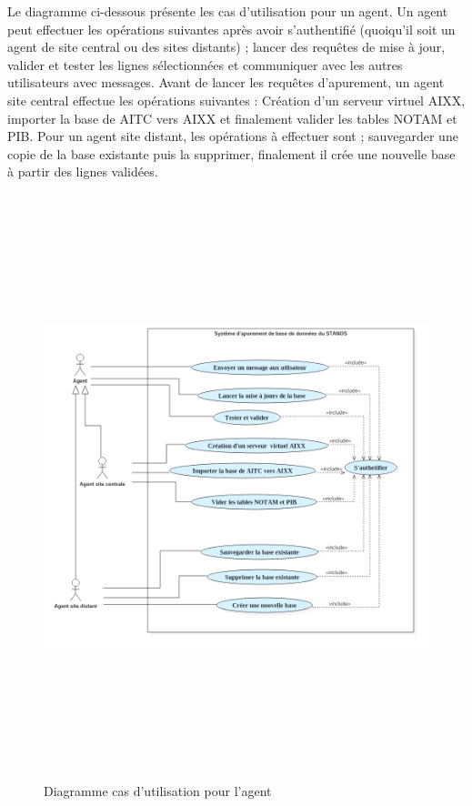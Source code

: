 Le diagramme ci-dessous présente les cas d’utilisation pour un agent. Un agent peut effectuer les opérations suivantes après avoir s’authentifié (quoiqu’il soit un agent de site central ou des sites distants) ; lancer des requêtes de mise à jour, valider et tester les lignes sélectionnées et communiquer avec les autres utilisateurs avec messages. Avant de lancer les requêtes d’apurement, un agent site central effectue les opérations suivantes : Création d’un serveur virtuel AIXX, importer la base de AITC vers AIXX et finalement valider les tables NOTAM et PIB. Pour un agent site distant, les opérations à effectuer sont ; sauvegarder une copie de la base existante puis la supprimer, finalement il crée une nouvelle base à partir des lignes validées.

\begin{figure}[!h]
\begin{center}
\includegraphics[width=17cm,height=17cm]{besoins/UseCaseDiagram1.png}
\end{center}
\caption{Diagramme cas d'utilisation pour l'agent}
\end{figure}
\
